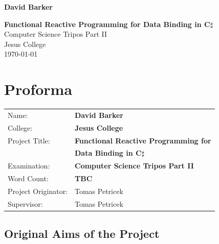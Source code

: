 \documentclass[12pt,twoside,notitlepage]{report}
\begin{document}





\pagestyle{empty}

\hfill{\LARGE \bf David Barker}

\vspace*{60mm}
\begin{center}
\Huge
{\bf Functional Reactive Programming for Data Binding in C$\sharp$} \\
\vspace*{5mm}
Computer Science Tripos Part II \\
\vspace*{5mm}
Jesus College \\
\vspace*{5mm}
\today  %
\end{center}

\cleardoublepage


\setcounter{page}{1}
\pagestyle{plain}

\chapter*{Proforma}

{\large
\begin{tabular}{ll}
Name:               & \bf David Barker \\
College:            & \bf Jesus College \\
Project Title:      & \bf Functional Reactive Programming for \\
					& \bf Data Binding in C$\sharp$ \\
Examination:        & \bf Computer Science Tripos Part II \\
Word Count:         & \bf TBC \\
Project Originator: & Tomas Petricek \\
Supervisor:         & Tomas Petricek \\
\end{tabular}
}


\section*{Original Aims of the Project}
\end{document}
